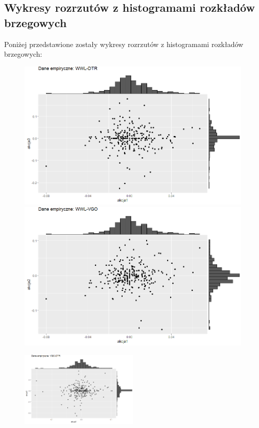 \documentclass[a4paper,11pt]{article}
\begin{document}
\newpage\subsection{Wykresy rozrzutów z histogramami rozkładów brzegowych}
Poniżej przedstawione zostały wykresy rozrzutów z histogramami rozkładów brzegowych:

\begin{figure}[!htb]
  \includegraphics[width=\linewidth]{./img/dane empiryczne-wwl-dtr.png}
\endminipage\hfill
{}
  \includegraphics[width=\linewidth]{./img/dane empiryczne-wwl-vgo.png}
\endminipage\hfill
\end{figure}
\begin{figure}[H]
    \centering
    \includegraphics[width=0.5\textwidth]{./img/dane empiryczne-vgo-dtr.png}
\end{figure}
\end{document}
